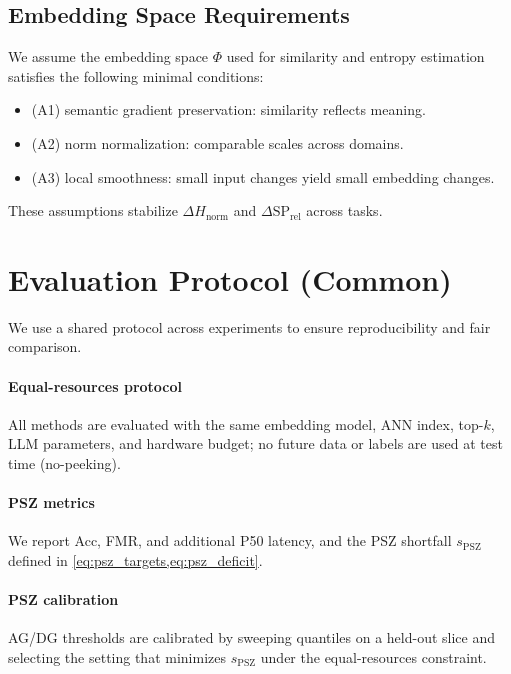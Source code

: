 \documentclass[12pt]{article}
\begin{document}
\subsection{Embedding Space Requirements}
\label{sec:phi_requirements}
We assume the embedding space $\Phi$ used for similarity and entropy estimation satisfies the following minimal conditions:
\begin{itemize}[leftmargin=*]
  \item (A1) semantic gradient preservation: similarity reflects meaning.
  \item (A2) norm normalization: comparable scales across domains.
  \item (A3) local smoothness: small input changes yield small embedding changes.
\end{itemize}
These assumptions stabilize $\Delta H_{\mathrm{norm}}$ and $\Delta \mathrm{SP}_{\mathrm{rel}}$ across tasks.


\section{Evaluation Protocol (Common)}
\label{sec:eval_protocol}
We use a shared protocol across experiments to ensure reproducibility and fair comparison.
\paragraph{Equal-resources protocol}\label{sec:equal_resources}
All methods are evaluated with the same embedding model, ANN index, top-$k$, LLM parameters, and hardware budget; no future data or labels are used at test time (no-peeking).
\paragraph{PSZ metrics}\label{sec:psz_metrics}
We report Acc, FMR, and additional P50 latency, and the PSZ shortfall $s_{\mathrm{PSZ}}$ defined in \cref{eq:psz_targets,eq:psz_deficit}.
\paragraph{PSZ calibration}\label{sec:psz_calibration}
AG/DG thresholds are calibrated by sweeping quantiles on a held-out slice and selecting the setting that minimizes $s_{\mathrm{PSZ}}$ under the equal-resources constraint.
\end{document}
